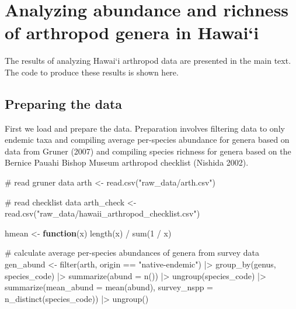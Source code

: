 \documentclass[
  letterpaper,
  DIV=11,
  numbers=noendperiod]{scrartcl}
\newenvironment{Shaded}{\begin{snugshade}}{\end{snugshade}}
\newcommand{\AttributeTok}[1]{\textcolor[rgb]{0.40,0.45,0.13}{#1}}
\newcommand{\CommentTok}[1]{\textcolor[rgb]{0.37,0.37,0.37}{#1}}
\newcommand{\ControlFlowTok}[1]{\textcolor[rgb]{0.00,0.23,0.31}{\textbf{#1}}}
\newcommand{\DecValTok}[1]{\textcolor[rgb]{0.68,0.00,0.00}{#1}}
\newcommand{\FunctionTok}[1]{\textcolor[rgb]{0.28,0.35,0.67}{#1}}
\newcommand{\NormalTok}[1]{\textcolor[rgb]{0.00,0.23,0.31}{#1}}
\newcommand{\OtherTok}[1]{\textcolor[rgb]{0.00,0.23,0.31}{#1}}
\newcommand{\SpecialCharTok}[1]{\textcolor[rgb]{0.37,0.37,0.37}{#1}}
\newcommand{\StringTok}[1]{\textcolor[rgb]{0.13,0.47,0.30}{#1}}
\begin{document}
\section{Analyzing abundance and richness of arthropod genera in
Hawai`i}\label{sec-bgeom}

The results of analyzing Hawai`i arthropod data are presented in the
main text. The code to produce these results is shown here.

\subsection{Preparing the data}\label{preparing-the-data}

First we load and prepare the data. Preparation involves filtering data
to only endemic taxa and compiling average per-species abundance for
genera based on data from Gruner (2007) and compiling species richness
for genera based on the Bernice Pauahi Bishop Museum arthropod checklist
(Nishida 2002).

\begin{Shaded}
\begin{Highlighting}[]
\CommentTok{\# read gruner data}
\NormalTok{arth }\OtherTok{\textless{}{-}} \FunctionTok{read.csv}\NormalTok{(}\StringTok{"raw\_data/arth.csv"}\NormalTok{)}

\CommentTok{\# read checklist data}
\NormalTok{arth\_check }\OtherTok{\textless{}{-}} \FunctionTok{read.csv}\NormalTok{(}\StringTok{"raw\_data/hawaii\_arthropod\_checklist.csv"}\NormalTok{)}

\NormalTok{hmean }\OtherTok{\textless{}{-}} \ControlFlowTok{function}\NormalTok{(x) }\FunctionTok{length}\NormalTok{(x) }\SpecialCharTok{/} \FunctionTok{sum}\NormalTok{(}\DecValTok{1} \SpecialCharTok{/}\NormalTok{ x)}

\CommentTok{\# calculate average per{-}species abundances of genera from survey data}
\NormalTok{gen\_abund }\OtherTok{\textless{}{-}} \FunctionTok{filter}\NormalTok{(arth, origin }\SpecialCharTok{==} \StringTok{"native{-}endemic"}\NormalTok{) }\SpecialCharTok{|\textgreater{}} 
    \FunctionTok{group\_by}\NormalTok{(genus, species\_code) }\SpecialCharTok{|\textgreater{}}
    \FunctionTok{summarize}\NormalTok{(}\AttributeTok{abund =} \FunctionTok{n}\NormalTok{()) }\SpecialCharTok{|\textgreater{}}
    \FunctionTok{ungroup}\NormalTok{(species\_code) }\SpecialCharTok{|\textgreater{}}
    \FunctionTok{summarize}\NormalTok{(}\AttributeTok{mean\_abund =} \FunctionTok{mean}\NormalTok{(abund), }
              \AttributeTok{survey\_nspp =} \FunctionTok{n\_distinct}\NormalTok{(species\_code)) }\SpecialCharTok{|\textgreater{}}
    \FunctionTok{ungroup}\NormalTok{()}
\end{Highlighting}
\end{Shaded}
\end{document}

